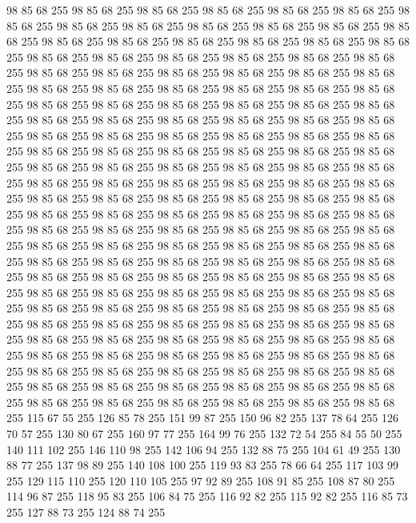 98 85 68 255 98 85 68 255 98 85 68 255 98 85 68 255 98 85 68 255 98 85 68 255 98 85 68 255 98 85 68 255 98 85 68 255 98 85 68 255 98 85 68 255 98 85 68 255 98 85 68 255 98 85 68 255 98 85 68 255 98 85 68 255 98 85 68 255 98 85 68 255 98 85 68 255 98 85 68 255 98 85 68 255 98 85 68 255 98 85 68 255 98 85 68 255 98 85 68 255 98 85 68 255 98 85 68 255 98 85 68 255 98 85 68 255 98 85 68 255 98 85 68 255 98 85 68 255 98 85 68 255 98 85 68 255 98 85 68 255 98 85 68 255 98 85 68 255 98 85 68 255 98 85 68 255 98 85 68 255 98 85 68 255 98 85 68 255 98 85 68 255 98 85 68 255 98 85 68 255 98 85 68 255 98 85 68 255 98 85 68 255 98 85 68 255 98 85 68 255 98 85 68 255 98 85 68 255 98 85 68 255 98 85 68 255 98 85 68 255 98 85 68 255 98 85 68 255 98 85 68 255 98 85 68 255 98 85 68 255 98 85 68 255 98 85 68 255 98 85 68 255 98 85 68 255
98 85 68 255 98 85 68 255 98 85 68 255 98 85 68 255 98 85 68 255 98 85 68 255 98 85 68 255 98 85 68 255 98 85 68 255 98 85 68 255 98 85 68 255 98 85 68 255 98 85 68 255 98 85 68 255 98 85 68 255 98 85 68 255 98 85 68 255 98 85 68 255 98 85 68 255 98 85 68 255 98 85 68 255 98 85 68 255 98 85 68 255 98 85 68 255 98 85 68 255 98 85 68 255 98 85 68 255 98 85 68 255 98 85 68 255 98 85 68 255 98 85 68 255 98 85 68 255 98 85 68 255 98 85 68 255 98 85 68 255 98 85 68 255 98 85 68 255 98 85 68 255 98 85 68 255 98 85 68 255 98 85 68 255 98 85 68 255 98 85 68 255 98 85 68 255 98 85 68 255 98 85 68 255 98 85 68 255 98 85 68 255 98 85 68 255 98 85 68 255 98 85 68 255 98 85 68 255 98 85 68 255 98 85 68 255 98 85 68 255 98 85 68 255 98 85 68 255 98 85 68 255 98 85 68 255 98 85 68 255 98 85 68 255 98 85 68 255 98 85 68 255 98 85 68 255
98 85 68 255 98 85 68 255 98 85 68 255 98 85 68 255 98 85 68 255 98 85 68 255 98 85 68 255 98 85 68 255 98 85 68 255 98 85 68 255 98 85 68 255 98 85 68 255 98 85 68 255 98 85 68 255 98 85 68 255 98 85 68 255 98 85 68 255 98 85 68 255 98 85 68 255 98 85 68 255 98 85 68 255 98 85 68 255 98 85 68 255 98 85 68 255 98 85 68 255 98 85 68 255 98 85 68 255 98 85 68 255 98 85 68 255 115 67 55 255 126 85 78 255 151 99 87 255 150 96 82 255 137 78 64 255 126 70 57 255 130 80 67 255 160 97 77 255 164 99 76 255 132 72 54 255 84 55 50 255 140 111 102 255 146 110 98 255 142 106 94 255 132 88 75 255 104 61 49 255 130 88 77 255 137 98 89 255 140 108 100 255 119 93 83 255 78 66 64 255 117 103 99 255 129 115 110 255 120 110 105 255 97 92 89 255 108 91 85 255 108 87 80 255 114 96 87 255 118 95 83 255 106 84 75 255 116 92 82 255 115 92 82 255 116 85 73 255 127 88 73 255 124 88 74 255
